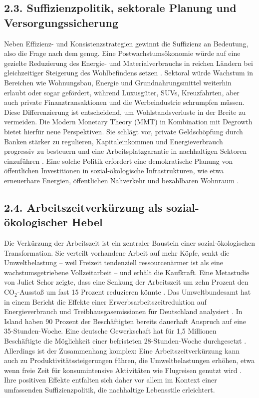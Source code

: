 \documentclass[12pt, a4paper]{article}
\begin{document}
	\subsection*{2.3. Suffizienzpolitik, sektorale Planung und Versorgungssicherung}
	Neben Effizienz- und Konsistenzstrategien gewinnt die Suffizienz an Bedeutung, also
	die Frage nach dem genug. Eine Postwachstumsökonomie würde auf eine gezielte
	Reduzierung des Energie- und Materialverbrauchs in reichen Ländern bei gleichzeitiger
	Steigerung des Wohlbefindens setzen \cite{greenpeace2025b}. Sektoral würde Wachstum
	in Bereichen wie Wohnungsbau, Energie und Grundnahrungsmittel weiterhin erlaubt oder
	sogar gefördert, während Luxusgüter, SUVs, Kreuzfahrten, aber auch private
	Finanztransaktionen und die Werbeindustrie schrumpfen müssen. Diese Differenzierung
	ist entscheidend, um Wohlstandsverluste in der Breite zu vermeiden. Die Modern
	Monetary Theory (MMT) in Kombination mit Degrowth bietet hierfür neue Perspektiven.
	Sie schlägt vor, private Geldschöpfung durch Banken stärker zu regulieren,
	Kapitaleinkommen und Energieverbrauch progressiv zu besteuern und eine
	Arbeitsplatzgarantie in nachhaltigen Sektoren einzuführen \cite{wu2023}. Eine solche
	Politik erfordert eine demokratische Planung von öffentlichen Investitionen in
	sozial-ökologische Infrastrukturen, wie etwa erneuerbare Energien, öffentlichen
	Nahverkehr und bezahlbaren Wohnraum \cite{scientists4future2025}.
	
	\subsection*{2.4. Arbeitszeitverkürzung als sozial-ökologischer Hebel}
	Die Verkürzung der Arbeitszeit ist ein zentraler Baustein einer sozial-ökologischen
	Transformation. Sie verteilt vorhandene Arbeit auf mehr Köpfe, senkt die
	Umweltbelastung – weil Freizeit tendenziell ressourcenärmer ist als eine
	wachstumsgetriebene Vollzeitarbeit – und erhält die Kaufkraft. Eine Metastudie von
	Juliet Schor zeigte, dass eine Senkung der Arbeitszeit um zehn Prozent den CO$_2$-Ausstoß
	um fast 15 Prozent reduzieren könnte \cite{dw2023}. Das Umweltbundesamt hat in einem
	Bericht die Effekte einer Erwerbsarbeitszeitreduktion auf Energieverbrauch und
	Treibhausgasemissionen für Deutschland analysiert \cite{uba2019}. In Island haben
	90 Prozent der Beschäftigten bereits dauerhaft Anspruch auf eine 35-Stunden-Woche.
	Eine deutsche Gewerkschaft hat für 1,5 Millionen Beschäftigte die Möglichkeit einer
	befristeten 28-Stunden-Woche durchgesetzt \cite{tsri2025}. Allerdings ist der
	Zusammenhang komplex: Eine Arbeitszeitverkürzung kann auch zu
	Produktivitätssteigerungen führen, die Umweltbelastungen erhöhen, etwa wenn freie
	Zeit für konsumintensive Aktivitäten wie Flugreisen genutzt wird \cite{monde2021}.
	Ihre positiven Effekte entfalten sich daher vor allem im Kontext einer umfassenden
	Suffizienzpolitik, die nachhaltige Lebensstile erleichtert.
	
\end{document}
